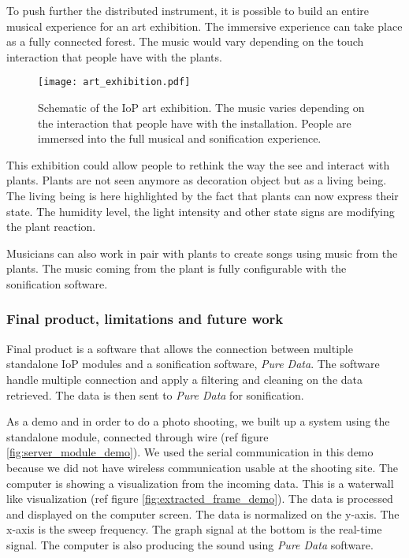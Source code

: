 To push further the distributed instrument, it is possible to build an entire
musical experience for an art exhibition.
The immersive experience can take place as a fully connected forest. The music would vary
depending on the touch interaction that people have with the plants.

\begin{figure}[h!]
    \centering
    \texttt{[image: art\_exhibition.pdf]}
    \caption{Schematic of the IoP art exhibition. The music varies depending on the
        interaction that people have with the installation. People are immersed into the full
        musical and sonification experience.}
    \vspace{0.1cm}
    \label{fig:art_exhibition}
\end{figure}

This exhibition could allow people to rethink the way the see and interact with plants.
Plants are not seen anymore as decoration object but as a living being.
The living being is here highlighted by the fact that plants can now express their state.
The humidity level, the light intensity and other state signs are modifying the plant
reaction.


Musicians can also work in pair with plants to create songs using music from the plants.
The music coming from the plant is fully configurable with the sonification software.


\subsubsection{Final product, limitations and future work}

Final product is a software that allows the connection between multiple standalone IoP modules and a sonification software, \textit{Pure Data}. The software handle multiple connection and apply a filtering and cleaning on the data
retrieved. The data is then sent to \textit{Pure Data} for sonification.

As a demo and in order to do a photo shooting, we built up a system using the standalone module, connected through wire (ref figure \ref{fig:server_module_demo}). We used the serial communication in this demo because we did not have wireless communication usable at the shooting site. The computer is showing a visualization from the incoming data. This is a waterwall like visualization (ref figure \ref{fig:extracted_frame_demo}). The data is processed and displayed on the computer screen. The data is normalized on the y-axis. The x-axis is the sweep frequency. The graph signal at the bottom is the real-time signal. The computer is also producing the sound using \textit{Pure Data} software.

